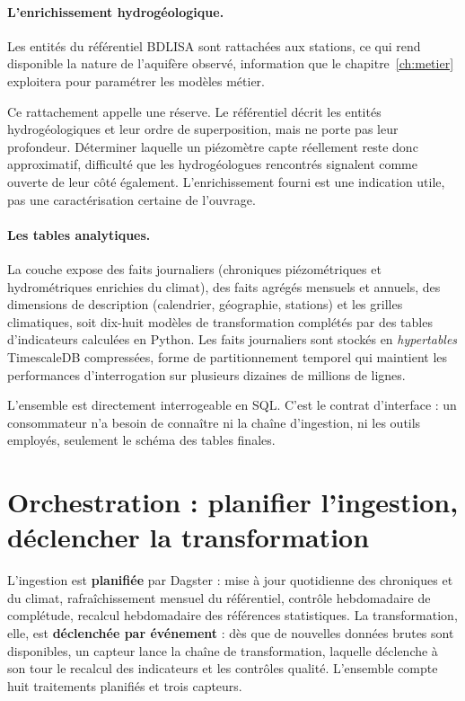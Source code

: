 \paragraph{L'enrichissement hydrogéologique.} Les entités du référentiel BDLISA sont rattachées
aux stations, ce qui rend disponible la nature de l'aquifère observé, information que le
chapitre~\ref{ch:metier} exploitera pour paramétrer les modèles métier.

Ce rattachement appelle une réserve. Le référentiel décrit les entités hydrogéologiques et leur
ordre de superposition, mais ne porte pas leur profondeur. Déterminer laquelle un piézomètre
capte réellement reste donc approximatif, difficulté que les hydrogéologues rencontrés signalent
comme ouverte de leur côté également. L'enrichissement fourni est une indication utile, pas une
caractérisation certaine de l'ouvrage.

\paragraph{Les tables analytiques.} La couche expose des faits journaliers (chroniques
piézométriques et hydrométriques enrichies du climat), des faits agrégés mensuels et annuels,
des dimensions de description (calendrier, géographie, stations) et les grilles climatiques,
soit dix-huit modèles de transformation complétés par des tables d'indicateurs calculées en
Python. Les faits journaliers sont stockés en \emph{hypertables} TimescaleDB compressées,
forme de partitionnement temporel qui maintient les performances d'interrogation sur plusieurs
dizaines de millions de lignes.

L'ensemble est directement interrogeable en SQL. C'est le contrat d'interface : un consommateur
n'a besoin de connaître ni la chaîne d'ingestion, ni les outils employés, seulement le schéma
des tables finales.

\section{Orchestration : planifier l'ingestion, déclencher la transformation}

L'ingestion est \textbf{planifiée} par Dagster : mise à jour quotidienne des chroniques et du
climat, rafraîchissement mensuel du référentiel, contrôle hebdomadaire de complétude, recalcul
hebdomadaire des références statistiques. La transformation, elle, est \textbf{déclenchée par
événement} : dès que de nouvelles données brutes sont disponibles, un capteur lance la chaîne de
transformation, laquelle déclenche à son tour le recalcul des indicateurs et les contrôles
qualité. L'ensemble compte huit traitements planifiés et trois capteurs.

